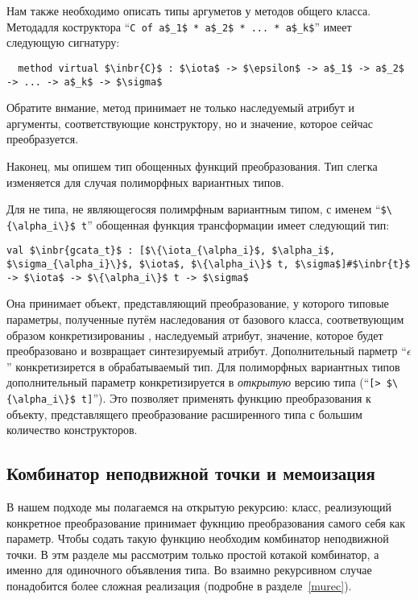 Нам также необходимо описать типы аргуметов у методов общего класса. Методадля коструктора  ``\lstinline|C of a$_1$ * a$_2$ * ... * a$_k$|'' имеет следующую сигнатуру:

\begin{lstlisting}
  method virtual $\inbr{C}$ : $\iota$ -> $\epsilon$ -> a$_1$ -> a$_2$ -> ... -> a$_k$ -> $\sigma$
\end{lstlisting}

Обратите внмание, метод принимает не только наследуемый атрибут и аргументы, соответствующие конструктору, но и значение, которое сейчас преобразуется.

Наконец, мы опишем тип обощенных функций преобразования. Тип слегка изменяется для случая полиморфных вариантных типов.


Для не типа, не являющегосяя полимрфным вариантным типом, с именем ``\lstinline|$\{\alpha_i\}$ t|'' обощенная функция трансформации имеет следующий тип:

\begin{lstlisting}
val $\inbr{gcata_t}$ : [$\{\iota_{\alpha_i}$, $\alpha_i$, $\sigma_{\alpha_i}\}$, $\iota$, $\{\alpha_i\}$ t, $\sigma$]#$\inbr{t}$ -> $\iota$ -> $\{\alpha_i\}$ t -> $\sigma$
\end{lstlisting}

Она принимает объект, представляющий преобразование, у которого типовые параметры, полученные путём наследования от базового класса, соответвующим образом конкретизированиы , наследуемый атрибут, значение, которое будет преобразовано и возвращает синтезируемый атрибут.
Дополнительный парметр ``$\epsilon$'' конкретизирется в обрабатываемый тип. 
Для полиморфных вариантных типов дополнительный параметр конкретизируется в \emph{открытую}
версию типа  (``\lstinline|[> $\{\alpha_i\}$ t]|''). 
Это позволяет применять функцию преобразования к объекту, представлящего преобразование расширенного типа с большим количество конструкторов.


\subsection{Комбинатор неподвижной точки и мемоизация}
\label{memofix}

В нашем подходе мы полагаемся  на открытую рекурсию: класс, реализующий конкретное преобразование принимает фукнцию преобразования самого себя как параметр.
Чтобы содать такую функцию необходим комбинатор неподвижной точки. В  этм разделе
мы рассмотрим только простой котакой комбинатор, а именно для одиночного объявления типа.
Во взаимно рекурсивном случае понадобится более сложная реализация (подробне в 
разделе~\ref{murec}).

